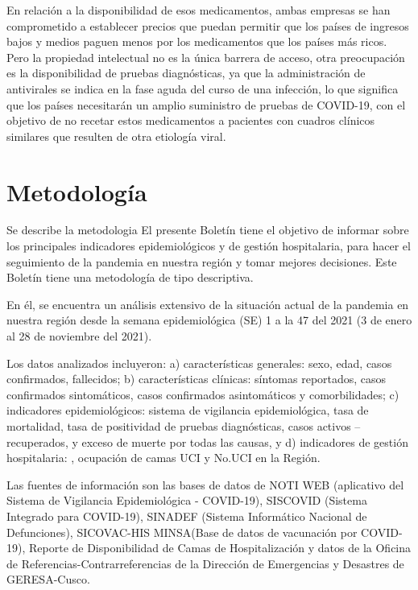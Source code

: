 \documentclass[12pt,a4paper,openany]{book}
\begin{document}
	En relación a la disponibilidad de esos medicamentos, ambas empresas se han comprometido a establecer precios que puedan permitir que los países de ingresos bajos y medios paguen menos por los medicamentos que los países más ricos. Pero la propiedad intelectual no es la única barrera de acceso, otra preocupación es la disponibilidad de pruebas diagnósticas, ya que la administración de antivirales se indica en la fase aguda del curso de una infección, lo que significa que los países necesitarán un amplio suministro de pruebas de COVID-19, con el objetivo de no recetar estos medicamentos a pacientes con cuadros clínicos similares que resulten de otra etiología viral.
	
	
	
	\clearpage
	
	\section*{Metodología}	
	Se describe la metodologia 
	\noindent El presente Boletín tiene el objetivo de informar sobre los principales indicadores epidemiológicos y de gestión hospitalaria,  para hacer el seguimiento de la pandemia en nuestra región y tomar mejores decisiones. Este Boletín tiene una metodología de tipo descriptiva. 
	
	En él, se encuentra un análisis extensivo de la situación actual de la pandemia en nuestra región desde la semana epidemiológica (SE) 1 a la 47 del 2021 (3 de enero al 28 de noviembre del 2021).
	
	Los datos analizados incluyeron: a) características generales: sexo, edad, casos confirmados, fallecidos; b) características clínicas: síntomas reportados, casos confirmados sintomáticos, casos confirmados asintomáticos y comorbilidades; c) indicadores epidemiológicos: sistema de vigilancia epidemiológica, tasa de mortalidad, tasa de positividad de pruebas diagnósticas, casos activos – recuperados, y exceso de muerte por todas las causas, y d) indicadores de gestión hospitalaria: , ocupación de camas UCI y No.UCI en la Región.
	
	Las fuentes de información son las bases de datos de NOTI WEB (aplicativo del Sistema de Vigilancia Epidemiológica - COVID-19), SISCOVID (Sistema Integrado para COVID-19), SINADEF (Sistema Informático Nacional de Defunciones), SICOVAC-HIS MINSA(Base de datos de vacunación por COVID-19), Reporte de Disponibilidad de Camas de Hospitalización y datos de la Oficina de Referencias-Contrarreferencias de la Dirección de Emergencias y Desastres de GERESA-Cusco. 
	
\end{document}
